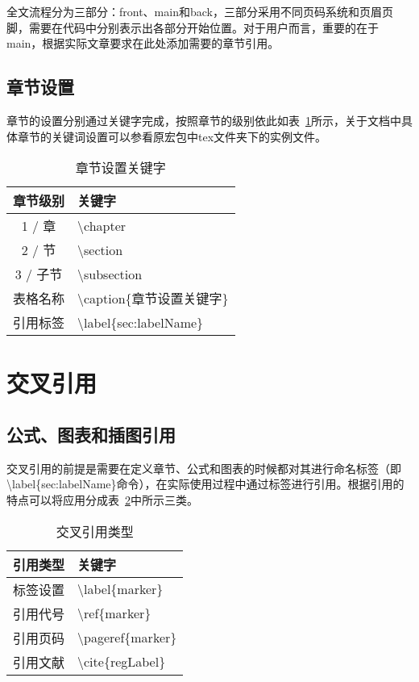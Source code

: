 全文流程分为三部分：front、main和back，三部分采用不同页码系统和页眉页脚，需要在代码中分别表示出各部分开始位置。对于用户而言，重要的在于main，根据实际文章要求在此处添加需要的章节引用。

\subsection{章节设置}
章节的设置分别通过关键字完成，按照章节的级别依此如表~\ref{tab:setSection}所示，关于文档中具体章节的关键词设置可以参看原宏包中tex文件夹下的实例文件。


\begin{table}
 \centering
  \caption{章节设置关键字}     %
  \label{tab:setSection}    %
  \begin{tabular}{cl}
    \hline
    章节级别        & 关键字     \\
    \hline
    1 / 章        & \textbackslash chapter \\
    2 / 节        & \textbackslash section \\
    3 / 子节      & \textbackslash  subsection \\
    表格名称       & \textbackslash caption\{章节设置关键字\} \\
    引用标签       & \textbackslash label\{sec:labelName\} \\
    \hline
  \end{tabular}
\end{table}


\section{交叉引用}
\subsection{公式、图表和插图引用}
\label{sec:refofFigAndTab}
交叉引用的前提是需要在定义章节、公式和图表的时候都对其进行命名标签（即\textbackslash label\{sec:labelName\}命令），在实际使用过程中通过标签进行引用。根据引用的特点可以将应用分成表~\ref{tab:citeType}中所示三类。

\begin{table}
 \centering
  \caption{交叉引用类型}       %
  \label{tab:citeType}    %
  \begin{tabular}{cl}
    \hline
    引用类型     & 关键字     \\
    \hline
    标签设置        & \textbackslash label\{marker\}  \\
    引用代号        & \textbackslash ref\{marker\}    \\
    引用页码        & \textbackslash pageref\{marker\} \\
    引用文献        & \textbackslash cite\{regLabel\} \\
    \hline
  \end{tabular}
\end{table}

